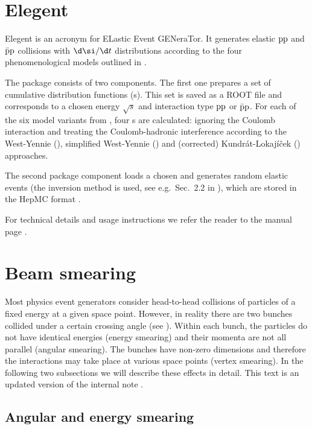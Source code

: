 \section[elegent]{Elegent}

Elegent is an acronym for ELastic Event GENeraTor. It generates elastic $\rm pp$ and $\rm\bar pp$ collisions with $\d\si/\d t$ distributions according to the four phenomenological models outlined in .

The package consists of two components. The first one prepares a set of cumulative distribution functions (s). This set is saved as a ROOT file and corresponds to a chosen energy $\sqrt s$ and interaction type $\rm pp$ or $\rm \bar pp$. For each of the six model variants from , four s are calculated: ignoring the Coulomb interaction and treating the Coulomb-hadronic interference according to the West-Yennie (), simplified West-Yennie () and (corrected) Kundr\' at-Lokaj\' i\v cek () approaches.

The second package component loads a chosen  and generates random elastic events (the inversion method is used, see e.g.~Sec.~2.2 in ), which are stored in the HepMC format .

For technical details and usage instructions we refer the reader to the manual page .



\section[beam smearing]{Beam smearing}

Most physics event generators consider head-to-head collisions of particles of a fixed energy at a given space point. However, in reality there are two bunches collided under a certain crossing angle (see ). Within each bunch, the particles do not have identical energies (energy smearing) and their momenta are not all parallel (angular smearing). The bunches have non-zero dimensions and therefore the interactions may take place at various space points (vertex smearing). In the following two subsections we will describe these effects in detail. This text is an updated version of the internal note .


\subsection{Angular and energy smearing}


